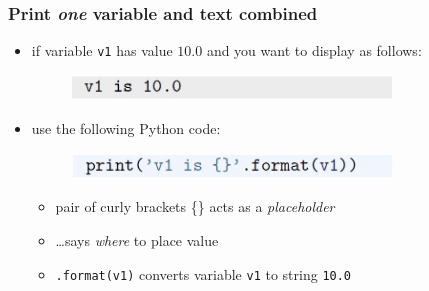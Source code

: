 \documentclass[14pt]{beamer}
\newcommand\red[1]{{\color{red} #1}}
\begin{document}
\begin{frame}[fragile]
\frametitle{Print \emph{one} variable and text combined}

\begin{itemize}
\item if variable \texttt{v1} has value $10.0$ and you want to display as follows:

\begin{figure}[ht]
	\centering
	\includegraphics[width=0.8\textwidth]{figures/LLp28a}
\end{figure}

\item use the following Python code:
\begin{figure}[ht]
	\centering
	\includegraphics[width=0.8\textwidth]{figures/LLp28b}
\end{figure}
	\begin{itemize}
		\item pair of curly brackets \{\} acts as a \red{\emph{placeholder}}
		\item \ldots says \emph{where} to place value
		\item \texttt{.format(v1)} converts variable \texttt{v1} to string \texttt{10.0}
	\end{itemize}
\end{itemize}

\end{frame}

\end{document}
